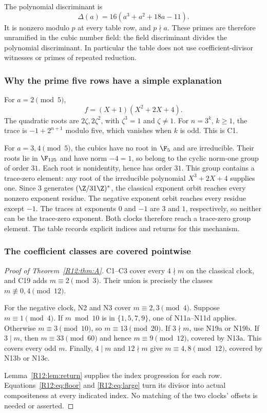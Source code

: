 \documentclass[11pt,a4paper]{article}
\theoremstyle{definition}\newtheorem{definition}[theorem]{Definition}
\theoremstyle{remark}\newtheorem{remark}[theorem]{Remark}
\begin{document}
The polynomial discriminant is
\begin{equation}\label{R12:eq:disc}
 \Delta(a)=16(a^3+a^2+18a-11).
\end{equation}
It is nonzero modulo $p$ at every table row, and $p\nmid a$.
These primes are therefore unramified in the cubic number field:
the field discriminant divides the polynomial discriminant.
In particular the table does not use coefficient-divisor witnesses
or primes of repeated reduction.

\subsubsection{Why the prime five rows have a simple explanation}

For $a=2\pmod5$,
\[
 f=(X+1)(X^2+2X+4).
\]
The quadratic roots are $2\zeta,2\zeta^2$, with
$\zeta^3=1$ and $\zeta\ne1$. For $n=3^k$, $k\ge1$, the trace is
$-1+2^{n+1}$ modulo five, which vanishes when $k$ is odd. This is C1.

For $a=3,4\pmod5$, the cubics have no root in $\F_5$ and are
irreducible. Their roots lie in $\F_{125}$ and have norm $-4=1$,
so belong to the cyclic norm-one group of order $31$. Each root is
nonidentity, hence has order $31$. This group contains a trace-zero
element: any root of the irreducible polynomial $X^3+2X+4$ supplies
one. Since $3$ generates $(\Z/31\Z)^*$, the classical exponent orbit
reaches every nonzero exponent residue. The negative exponent orbit
reaches every residue except $-1$. The traces at exponents $0$ and
$-1$ are $3$ and $1$, respectively, so neither can be the trace-zero
exponent. Both clocks therefore reach a trace-zero group element.
The table records explicit indices and returns for this mechanism.

\subsubsection{The coefficient classes are covered pointwise}

\begin{proof}[Proof of Theorem~\ref{R12:thm:A}]
C1--C3 cover every $4\nmid m$ on the classical clock, and C19 adds
$m\equiv2\pmod3$. Their union is precisely the classes
$m\not\equiv0,4\pmod{12}$.

For the negative clock, N2 and N3 cover $m\equiv2,3\pmod4$.
Suppose $m\equiv1\pmod4$. If $m\bmod10$ is in $\{1,5,7,9\}$,
one of N11a--N11d applies. Otherwise $m\equiv3\pmod{10}$, so
$m\equiv13\pmod{20}$. If $3\nmid m$, use N19a or N19b.
If $3\mid m$, then $m\equiv33\pmod{60}$ and hence
$m\equiv9\pmod{12}$, covered by N13a. This covers every odd $m$.
Finally, $4\mid m$ and $12\nmid m$ give $m\equiv4,8\pmod{12}$,
covered by N13b or N13c.

Lemma~\ref{R12:lem:return} supplies the index progression for each row.
Equations~\eqref{R12:eq:floor} and \eqref{R12:eq:large} turn its divisor into
actual compositeness at every indicated index. No matching of the
two clocks' offsets is needed or asserted.
\end{proof}
\end{document}
